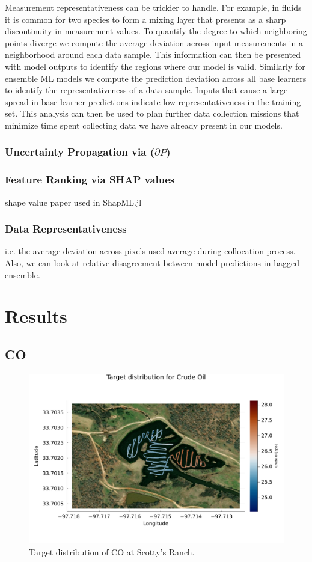 \documentclass[remotesensing,article,submit,pdftex,moreauthors]{Definitions/mdpi}
\begin{document}
Measurement representativeness can be trickier to handle. For example, in fluids it is common for two species to form a mixing layer that presents as a sharp discontinuity in measurement values. To quantify the degree to which neighboring points diverge we compute the average deviation across input measurements in a neighborhood around each data sample. This information can then be presented with model outputs to identify the regions where our model is valid. Similarly for ensemble ML models we compute the prediction deviation across all base learners to identify the representativeness of a data sample. Inputs that cause a large spread in base learner predictions indicate low representativeness in the training set. This analysis can then be used to plan further data collection missions that minimize time spent collecting data we have already present in our models. 

\subsubsection{Uncertainty Propagation via ($\partial P$)}

\subsubsection{Feature Ranking via SHAP values}

shape value paper used in ShapML.jl \cite{SHAPvalues1}

\subsubsection{Data Representativeness}
i.e. the average deviation across pixels used average during collocation process.
Also, we can look at relative disagreement between model predictions in bagged ensemble. 

\section{Results}
\subsection{CO}

\begin{figure}[H]
\includegraphics[width=10.5 cm]{images/CO/CO_dataMap.png}
\caption{Target distribution of CO at Scotty's Ranch.\label{CO_targetMap}}
\end{figure} 
\end{document}
